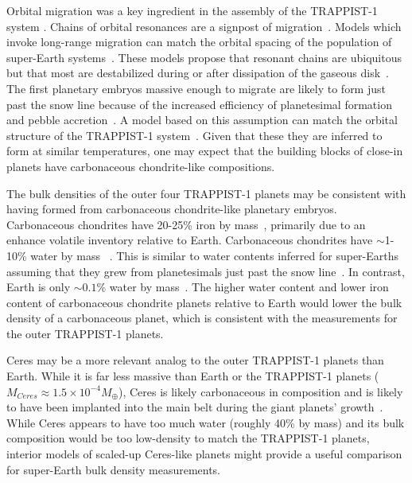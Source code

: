 \documentclass[fleqn,usenatbib]{mnras} %
\begin{document}
Orbital migration was a key ingredient in the assembly of the TRAPPIST-1 system \citep{Tamayo2017,Ormel2017,Papaloizou2017,MacDonald2018,coleman19}.  Chains of orbital resonances are a signpost of migration~\citep[e.g.]{Cresswell2008}. Models which invoke long-range migration can match the orbital spacing of the population of super-Earth systems~\citep{izidoro17,izidoro19}. These models propose that resonant chains are ubiquitous but that most are destabilized during or after dissipation of the gaseous disk~\citep{terquem07,ogihara09,mcneil10,cossou14}. The first planetary embryos massive enough to migrate are likely to form just past the snow line because of the increased efficiency of planetesimal formation and pebble accretion~\citep{lambrechts14,Ormel2017}. A model based on this assumption can match the orbital structure of the TRAPPIST-1 system~\citep{Schoonenberg2019}. Given that these they are inferred to form at similar temperatures, one may expect that the building blocks of close-in planets have carbonaceous chondrite-like compositions. 

The bulk densities of the outer four TRAPPIST-1 planets may be consistent with having formed from carbonaceous chondrite-like planetary embryos. Carbonaceous chondrites have 20-25\% iron by mass~\citep[see values compiled in][]{lodders98}, primarily due to an enhance volatile inventory relative to Earth.  Carbonaceous chondrites have ${\sim}$1-10\% water by mass~
\citep[and are thought to represent the source population of planetesimals that delivered water to Earth; see][for a review]{meech20}. This is similar to water contents inferred for super-Earths assuming that they grew from planetesimals just past the snow line~\citep{Ormel2017,Schoonenberg2019,bitsch19,Liu2020}. In contrast, Earth is only ${\sim} 0.1\%$ water by mass~\citep[e.g., ][although uncertainties remain in the core's hydrogen content]{hirschmann06,marty12}. The higher water content and lower iron content of carbonaceous chondrite planets relative to Earth would lower the bulk density of a carbonaceous planet, which is consistent with the measurements for the outer TRAPPIST-1 planets. 

Ceres may be a more relevant analog to the outer TRAPPIST-1 planets than Earth. While it is far less massive than Earth or the TRAPPIST-1 planets ($M_{Ceres} {\approx} 1.5 {\times} 10^{-4} M_\oplus$), Ceres is likely carbonaceous in composition \citep{bland16,mcsween18,marchi19} and is likely to have been implanted into the main belt during the giant planets' growth~\citep{raymond17}. While Ceres appears to have too much water (roughly 40\% by mass) and its bulk composition would be too low-density to match the TRAPPIST-1 planets, interior models of scaled-up Ceres-like planets might provide a useful comparison for super-Earth bulk density measurements. 
\end{document}
